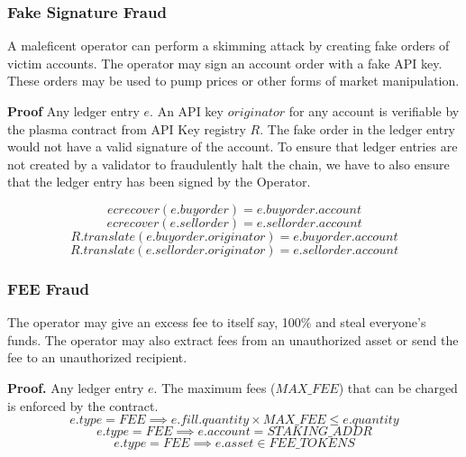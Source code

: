 \documentclass[12pt,a4paper]{article}
\begin{document}
\subsubsection{Fake Signature Fraud} \label{fp:fsf}
A maleficent operator can perform a skimming attack by creating fake orders of victim accounts. The operator may sign an account order with a fake API key\cite{levzkapi}. These orders may be used to pump prices or other forms of market manipulation.

\textbf{Proof} 
Any ledger entry $e$. An API key $originator$ for any account is verifiable by the plasma contract from API Key registry $R$. The fake order in the ledger entry would not have a valid signature of the account. To ensure that ledger entries are not created by a validator to fraudulently halt the chain, we have to also ensure that the ledger entry has been signed by the Operator.

\begin{equation}ecrecover(e.buyorder) = e.buyorder.account\end{equation}
\begin{equation}
ecrecover(e.sellorder) = e.sellorder.account
\end{equation}
\begin{equation}
    R.translate(e.buyorder.originator) = e.buyorder.account
\end{equation}
\begin{equation}
    R.translate(e.sellorder.originator) = e.sellorder.account    
\end{equation}
 
\subsubsection{FEE Fraud} \label{fp:fee}
The operator may give an excess fee to itself say, 100\% and steal everyone’s funds. The operator may also extract fees from an unauthorized asset or send the fee to an unauthorized recipient.

\textbf{Proof.} 
Any ledger entry $e$. The maximum fees ($MAX\_FEE$) that can be charged is enforced by the contract.
\begin{equation}
    e.type = FEE \implies e.fill.quantity \times MAX\_FEE \leq e.quantity
\end{equation}
\begin{equation}
    e.type = FEE \implies e.account = STAKING\_ADDR
\end{equation}
\begin{equation}
    e.type = FEE \implies e.asset \in FEE\_TOKENS 
\end{equation}
\end{document}

